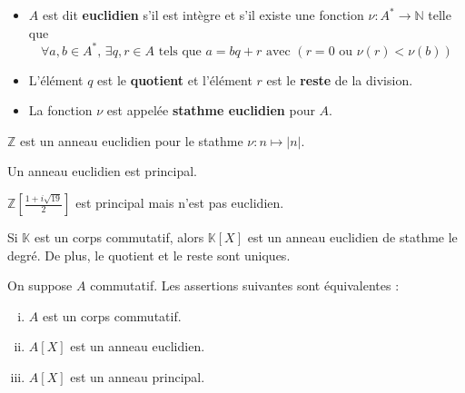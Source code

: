 	
	\begin{definition}
		\begin{itemize}
			\item $A$ est dit \textbf{euclidien} s'il est intègre et s'il existe une fonction $\nu : A^* \rightarrow \mathbb{N}$ telle que
			\[ \forall a, b \in A^*, \, \exists q, r \in A \text{ tels que } a = bq+r \text{ avec } (r = 0 \text{ ou } \nu(r) < \nu(b)) \]
			\item L'élément $q$ est le \textbf{quotient} et l'élément $r$ est le \textbf{reste} de la division.
			\item La fonction $\nu$ est appelée \textbf{stathme euclidien} pour $A$.
		\end{itemize}
	\end{definition}
	
	\begin{example}
		$\mathbb{Z}$ est un anneau euclidien pour le stathme $\nu : n \mapsto \vert n \vert$.
	\end{example}
	
	\begin{proposition}
		Un anneau euclidien est principal.
	\end{proposition}
	
	
	\begin{cexample}
		$\mathbb{Z} \left[ \frac{1 + i\sqrt{19}}{2} \right]$ est principal mais n'est pas euclidien.
	\end{cexample}
	
	
	\begin{theorem}
		Si $\mathbb{K}$ est un corps commutatif, alors $\mathbb{K}[X]$ est un anneau euclidien de stathme le degré. De plus, le quotient et le reste sont uniques.
	\end{theorem}
	
	\begin{corollary}
		On suppose $A$ commutatif. Les assertions suivantes sont équivalentes :
		\begin{enumerate}[(i)]
			\item $A$ est un corps commutatif.
			\item $A[X]$ est un anneau euclidien.
			\item $A[X]$ est un anneau principal.
		\end{enumerate}
	\end{corollary}
	
